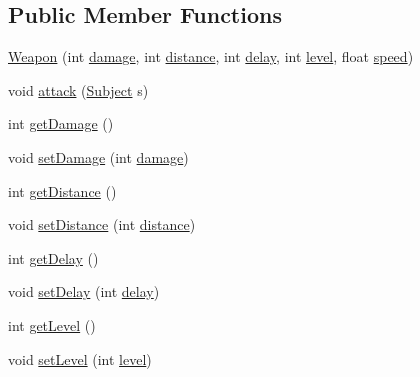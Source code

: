 \subsection*{Public Member Functions}
\begin{DoxyCompactItemize}
\item 
\mbox{\hyperlink{classitems_1_1weapons_1_1_weapon_a00bbeeb9d5f57ed1f0c9a9013e353f42}{Weapon}} (int \mbox{\hyperlink{classitems_1_1weapons_1_1_weapon_aa84d0aca66daedb3adb9209b6f2846a3}{damage}}, int \mbox{\hyperlink{classitems_1_1weapons_1_1_weapon_a125dc77704bbb1758d35f282802dcb8d}{distance}}, int \mbox{\hyperlink{classitems_1_1weapons_1_1_weapon_acf51fcf734c1ce98cbc6d1c2912e8058}{delay}}, int \mbox{\hyperlink{classitems_1_1weapons_1_1_weapon_ae66ceb47ad12380ee5d39960606980b3}{level}}, float \mbox{\hyperlink{classitems_1_1weapons_1_1_weapon_ac653ddf600cd6add7078dc32b5f1584a}{speed}})
\item 
void \mbox{\hyperlink{classitems_1_1weapons_1_1_weapon_a2d097d82844c1426c09cf26d2f5a1b94}{attack}} (\mbox{\hyperlink{classentities_1_1_subject}{Subject}} s)
\item 
int \mbox{\hyperlink{classitems_1_1weapons_1_1_weapon_ac77d8b8350bf90ab04a2f8869f73358c}{get\+Damage}} ()
\item 
void \mbox{\hyperlink{classitems_1_1weapons_1_1_weapon_acf41ab9ef5553f5cb088c97239b67246}{set\+Damage}} (int \mbox{\hyperlink{classitems_1_1weapons_1_1_weapon_aa84d0aca66daedb3adb9209b6f2846a3}{damage}})
\item 
int \mbox{\hyperlink{classitems_1_1weapons_1_1_weapon_a4cc44ba68fb6d469b39ccdbd0fd418b6}{get\+Distance}} ()
\item 
void \mbox{\hyperlink{classitems_1_1weapons_1_1_weapon_a051f07bce12bb2aeec2d7f1f7c5a03e5}{set\+Distance}} (int \mbox{\hyperlink{classitems_1_1weapons_1_1_weapon_a125dc77704bbb1758d35f282802dcb8d}{distance}})
\item 
int \mbox{\hyperlink{classitems_1_1weapons_1_1_weapon_acff36703dc4c95e39a445288d3899980}{get\+Delay}} ()
\item 
void \mbox{\hyperlink{classitems_1_1weapons_1_1_weapon_a98719da299135bbd2a0ea2db0afef911}{set\+Delay}} (int \mbox{\hyperlink{classitems_1_1weapons_1_1_weapon_acf51fcf734c1ce98cbc6d1c2912e8058}{delay}})
\item 
int \mbox{\hyperlink{classitems_1_1weapons_1_1_weapon_af054e780a042127d21810e4a9c7fa75a}{get\+Level}} ()
\item 
void \mbox{\hyperlink{classitems_1_1weapons_1_1_weapon_adaf7cf7bef079e47d814aa0350b691ba}{set\+Level}} (int \mbox{\hyperlink{classitems_1_1weapons_1_1_weapon_ae66ceb47ad12380ee5d39960606980b3}{level}})

\end{DoxyCompactItemize}
